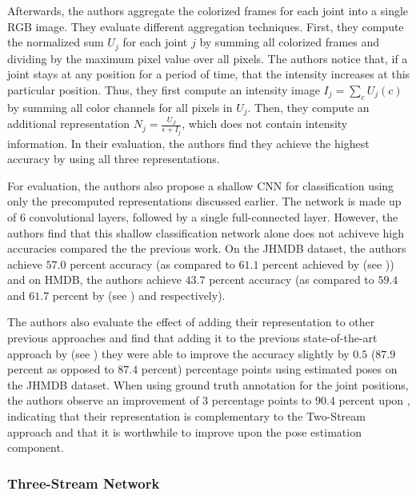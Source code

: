 Afterwards, the authors aggregate the colorized frames for each joint into a single RGB image.
They evaluate different aggregation techniques.
First, they compute the normalized sum $U_j$ for each joint $j$ by summing all colorized frames and dividing by the maximum pixel value over all pixels.
The authors notice that, if a joint stays at any position for a period of time, that the intensity increases at this particular position.
Thus, they first compute an intensity image $I_j = \sum_c U_j(c)$ by summing all color channels for all pixels in $U_j$.
Then, they compute an additional representation $N_j = \frac{U_J}{\epsilon + I_j}$, which does not contain intensity information.
In their evaluation, the authors find they achieve the highest accuracy by using all three representations.

For evaluation, the authors also propose a shallow CNN for classification using only the precomputed representations discussed earlier.
The network is made up of $6$ convolutional layers, followed by a single full-connected layer.
However, the authors find that this shallow classification network alone does not achiveve high accuracies compared the the previous work.
On the JHMDB dataset, the authors achieve $57.0$ percent accuracy (as compared to $61.1$ percent achieved by \cite{cheron_pcnn_2015} (see )) and on HMDB, the authors achieve $43.7$ percent accuracy (as compared to $59.4$ and $61.7$ percent by \cite{simonyan_two-stream_2014} (see ) and \cite{wang_action_2013}  respectively).

The authors also evaluate the effect of adding their representation to other previous approaches and find that adding it to the previous state-of-the-art approach by \cite{carreira_quo_2017} (see ) they were able to improve the accuracy slightly by $0.5$ ($87.9$ percent as opposed to $87.4$ percent) percentage points using estimated poses on the JHMDB dataset.
When using ground truth annotation for the joint positions, the authors observe an improvement of $3$ percentage points to $90.4$ percent upon \cite{carreira_quo_2017}, indicating that their representation is complementary to the Two-Stream approach and that it is worthwhile to improve upon the pose estimation component.

\subsubsection{Three-Stream Network}
\label{sec:three-stream}


